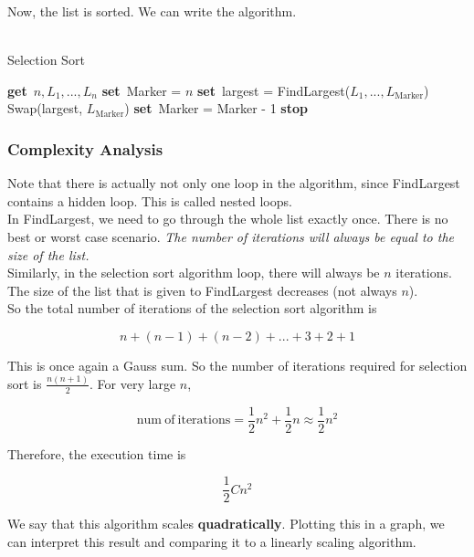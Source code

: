 \documentclass[]{article}
\newcommand{\Get}{\State \textbf{get}~}
\newcommand{\Set}{\State \textbf{set}~}
\newcommand{\Stop}{\State \textbf{stop}~}
\begin{document}
\bigbreak\bigbreak
Now, the list is sorted. We can write the algorithm.\\


\begin{algorithm}
	\caption{\\Selection Sort}
	\begin{algorithmic}[1]
		\Get $n, L_1, ..., L_n$
		\Set Marker = $n$
			\Set largest = FindLargest($L_1, ..., L_{\mathrm{Marker}}$)
			\State Swap(largest, $L_{\mathrm{Marker}}$)
			\Set Marker = Marker - 1
		\EndWhile
		\Stop
	\end{algorithmic}
\end{algorithm}

\subsubsection{Complexity Analysis}
\bigbreak

Note that there is actually not only one loop in the algorithm, since FindLargest contains a hidden loop. This is called nested loops.\\

In FindLargest, we need to go through the whole list exactly once. There is no best or worst case scenario. \textit{The number of iterations will always be equal to the size of the list.}\\

Similarly, in the selection sort algorithm loop, there will always be $n$ iterations. The size of the list that is given to FindLargest decreases (not always $n$).\\

So the total number of iterations of the selection sort algorithm is 

\[ n + (n-1) + (n-2) + ... + 3 + 2 + 1\]

This is once again a Gauss sum. So the number of iterations required for selection sort is $\frac{n(n+1)}{2}$. For very large $n$, 

\[\mathrm{num~of~iterations} = \frac{1}{2}n^2 + \frac{1}{2}n \approx \frac{1}{2}n^2\]

Therefore, the execution time is 

\[\frac{1}{2}Cn^2\]

We say that this algorithm scales \textbf{quadratically}. Plotting this in a graph, we can interpret this result and comparing it to a linearly scaling algorithm.

\bigbreak
\begin{center}
\end{center}
\end{document}
